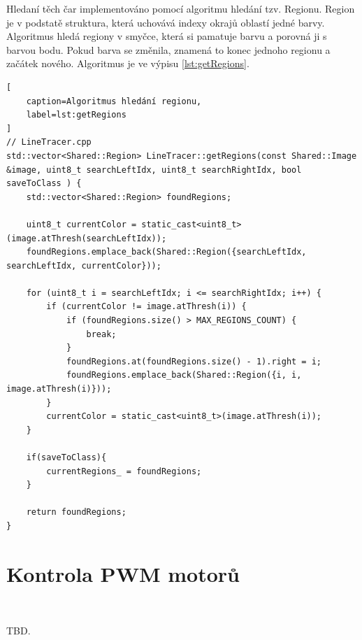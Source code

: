 Hledaní těch čar implementováno pomocí algoritmu hledání tzv. Regionu.
Region je v podstatě struktura, která uchovává indexy okrajů oblastí jedné barvy.
Algoritmus hledá regiony v smyčce, která si pamatuje barvu a porovná ji s barvou bodu.
Pokud barva se změnila, znamená to konec jednoho regionu a začátek nového.
Algoritmus je ve výpisu \ref{lst:getRegions}\cite{robot}.
\begin{lstlisting}[
	caption=Algoritmus hledání regionu,
	label=lst:getRegions
]
// LineTracer.cpp
std::vector<Shared::Region> LineTracer::getRegions(const Shared::Image &image, uint8_t searchLeftIdx, uint8_t searchRightIdx, bool saveToClass ) {
	std::vector<Shared::Region> foundRegions;

	uint8_t currentColor = static_cast<uint8_t>(image.atThresh(searchLeftIdx));
	foundRegions.emplace_back(Shared::Region({searchLeftIdx, searchLeftIdx, currentColor}));

	for (uint8_t i = searchLeftIdx; i <= searchRightIdx; i++) {
		if (currentColor != image.atThresh(i)) {
			if (foundRegions.size() > MAX_REGIONS_COUNT) {
				break;
			}
			foundRegions.at(foundRegions.size() - 1).right = i;
			foundRegions.emplace_back(Shared::Region({i, i, image.atThresh(i)}));
		}
		currentColor = static_cast<uint8_t>(image.atThresh(i));
	}

	if(saveToClass){
		currentRegions_ = foundRegions;
	}

	return foundRegions;
}
\end{lstlisting}

\section{Kontrola PWM motorů}\

TBD.


\endinput
